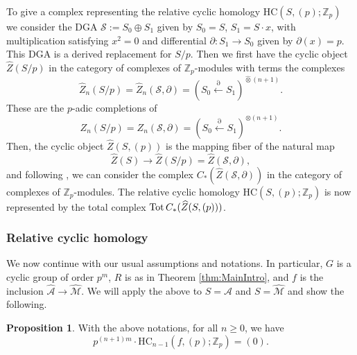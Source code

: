 \documentclass[reqno,11pt,letterpaper]{amsart}
\theoremstyle{plain}
\numberwithin{equation}{subsection}
\newtheorem{proposition}[equation]{Proposition}
\theoremstyle{remark}
\theoremstyle{plain}
\theoremstyle{definition}\newtheorem*{notation}{Notation}
\newcommand{\calS}{{\mathcal S}}
\newcommand{\A}{{\mathcal A}}
\newcommand{\Z}{{\mathbb Z}}
\newcommand{\M}{{\mathcal M}}
\newtheorem{proposition}[theorem]{Proposition}
\newcommand{\BZ}{\mathbb{Z}}
\newcommand{\HC}{\mathrm{HC}}
\newcommand{\wh}{\widehat}
\begin{document}
 To give a complex representing the relative cyclic homology $\HC(S, (p);\BZ_p)$ we consider the DGA
 $\calS:=S_0\oplus S_1$
given by $S_0=S$, $S_1=S\cdot x$, with multiplication satisfying $x^2=0$ and differential $\partial: S_1\to S_0$ given by $\partial(x)=p$.  This DGA is a derived replacement for $S/p$.  Then we first have the cyclic object
 $\wh Z(S/p)$ in the category of complexes of $\BZ_p$-modules with terms the complexes
 \[
 \wh Z_n(S/p)=\wh Z_n(\calS, \partial)=(S_0\xleftarrow{\partial} S_1)^{\hat\otimes (n+1)}.
 \] 
These are the $p$-adic completions of
 \[
 Z_n(S/p)= Z_n(\calS, \partial)=(S_0\xleftarrow{\partial} S_1)^{ \otimes (n+1)}.
 \]
 Then, the cyclic object $\wh Z( S, (p))$ is the mapping fiber of the natural map
\[
\wh Z(S)\to \wh Z(S/p)=\wh Z(\calS, \partial),
\]
 and following \cite{GoodTop}, we can consider the complex $C_*(\wh Z(\calS, \partial))$ in the category of complexes of $\BZ_p$-modules.
 The relative cyclic homology  $\HC(S, (p);\BZ_p)$ is now 
represented by the total complex ${\rm Tot}\, C_*(\wh Z( S, (p)))$.


\subsubsection{Relative cyclic homology} 

We now continue with our usual assumptions and notations.
In particular, $G$ is a cyclic group of order $p^m$, $R$ is as in Theorem \ref{thm:MainIntro}, and $f$ is the inclusion $\wh \A\to \wh \M$. 
We will apply  the above to $S=\wh \A$ and $S=\wh\M$ and show the following.


 \begin{proposition}\label{lemma:HCconductor}
With the above notations, for all $n\geq 0$, we have
\[
p^{(n+1)m}\cdot \HC_{n-1}(f, (p);\Z_p)=(0).
\]
\end{proposition}
\end{document}
